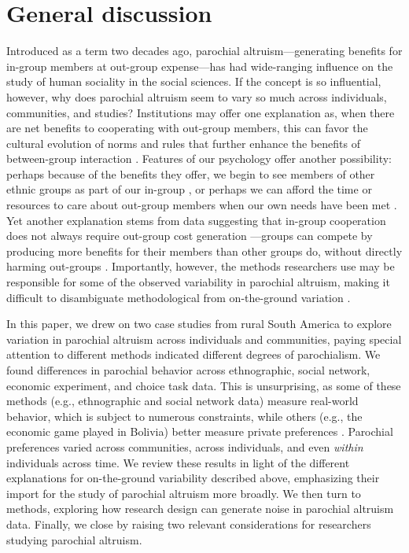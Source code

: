 \documentclass[bibauthoryear]{aa}
\begin{document}
\section{General discussion}
Introduced as a term two decades ago, parochial altruism---generating benefits for in-group members at out-group expense---has had wide-ranging influence on the study of human sociality in the social sciences. If the concept is so influential, however, why does parochial altruism seem to vary so much across individuals, communities, and studies? Institutions may offer one explanation as, when there are net benefits to cooperating with out-group members, this can favor the cultural evolution of norms and rules that further enhance the benefits of between-group interaction \citep{fearon1996explaining, fry2018evolutionary, pisor2019evolution}. Features of our psychology offer another possibility: perhaps because of the benefits they offer, we begin to see members of other ethnic groups as part of our in-group \citep{brewer1976ethnocentrism, beck2006cosmopolitan, buchan2009globalization, fukuyama2001social, hruschka2013economic, mau2008cosmopolitan, singer2011expanding}, or perhaps we can afford the time or resources to care about out-group members when our own needs have been met \citep{hruschka2014impartial, silva2014cooperation}. Yet another explanation stems from data suggesting that in-group cooperation does not always require out-group cost generation \citep{purzycki2019identity, hruschka2013economic, yamagishi2016parochial, brewer2006evolutionary, schaub2017threat, cashdan2001ethnocentrism, Rusch2014}---groups can compete by producing more benefits for their members than other groups do, without directly harming out-groups \citep{waring2015}. Importantly, however, the methods researchers use may be responsible for some of the observed variability in parochial altruism, making it difficult to disambiguate methodological from on-the-ground variation \citep{Pisor2020}.

In this paper, we drew on two case studies from rural South America to explore variation in parochial altruism across individuals and communities, paying special attention to different methods indicated different degrees of parochialism. We found differences in parochial behavior across ethnographic, social network, economic experiment, and choice task data. This is unsurprising, as some of these methods (e.g., ethnographic and social network data) measure real-world behavior, which is subject to numerous constraints, while others (e.g., the economic game played in Bolivia) better measure private preferences \citep{Pisor2020}. Parochial preferences varied across communities, across individuals, and even \emph{within} individuals across time. We review these results in light of the different explanations for on-the-ground variability described above, emphasizing their import for the study of parochial altruism more broadly. We then turn to methods, exploring how research design can generate noise in parochial altruism data. Finally, we close by raising two relevant considerations for researchers studying parochial altruism.
\end{document}
